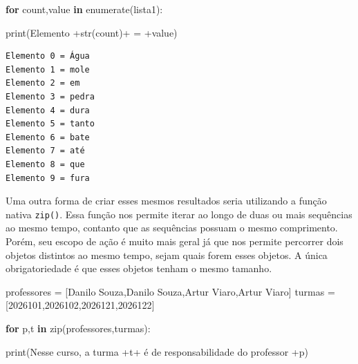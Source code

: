 \documentclass[
  brazilian,
  letterpaper,
  DIV=11,
  numbers=noendperiod]{scrreprt}
\newenvironment{Shaded}{\begin{snugshade}}{\end{snugshade}}
\newcommand{\BuiltInTok}[1]{\textcolor[rgb]{0.00,0.23,0.31}{#1}}
\newcommand{\ControlFlowTok}[1]{\textcolor[rgb]{0.00,0.23,0.31}{\textbf{#1}}}
\newcommand{\KeywordTok}[1]{\textcolor[rgb]{0.00,0.23,0.31}{\textbf{#1}}}
\newcommand{\NormalTok}[1]{\textcolor[rgb]{0.00,0.23,0.31}{#1}}
\newcommand{\OperatorTok}[1]{\textcolor[rgb]{0.37,0.37,0.37}{#1}}
\newcommand{\StringTok}[1]{\textcolor[rgb]{0.13,0.47,0.30}{#1}}
\begin{document}
\begin{Shaded}
\begin{Highlighting}[]
\ControlFlowTok{for}\NormalTok{ count,value }\KeywordTok{in} \BuiltInTok{enumerate}\NormalTok{(lista1):}
    
    \BuiltInTok{print}\NormalTok{(}\StringTok{\textquotesingle{}Elemento \textquotesingle{}}\OperatorTok{+}\BuiltInTok{str}\NormalTok{(count)}\OperatorTok{+}\StringTok{\textquotesingle{} = \textquotesingle{}}\OperatorTok{+}\NormalTok{value)}
\end{Highlighting}
\end{Shaded}

\begin{verbatim}
Elemento 0 = Água
Elemento 1 = mole
Elemento 2 = em
Elemento 3 = pedra
Elemento 4 = dura
Elemento 5 = tanto
Elemento 6 = bate
Elemento 7 = até
Elemento 8 = que
Elemento 9 = fura
\end{verbatim}

Uma outra forma de criar esses mesmos resultados seria utilizando a
função nativa \texttt{zip()}. Essa função nos permite iterar ao longo de
duas ou mais sequências ao mesmo tempo, contanto que as sequências
possuam o mesmo comprimento. Porém, seu escopo de ação é muito mais
geral já que nos permite percorrer dois objetos distintos ao mesmo
tempo, sejam quais forem esses objetos. A única obrigatoriedade é que
esses objetos tenham o mesmo tamanho.

\begin{Shaded}
\begin{Highlighting}[]
\NormalTok{professores }\OperatorTok{=}\NormalTok{ [}\StringTok{\textquotesingle{}Danilo Souza\textquotesingle{}}\NormalTok{,}\StringTok{\textquotesingle{}Danilo Souza\textquotesingle{}}\NormalTok{,}\StringTok{\textquotesingle{}Artur Viaro\textquotesingle{}}\NormalTok{,}\StringTok{\textquotesingle{}Artur Viaro\textquotesingle{}}\NormalTok{]}
\NormalTok{turmas }\OperatorTok{=}\NormalTok{ [}\StringTok{\textquotesingle{}2026101\textquotesingle{}}\NormalTok{,}\StringTok{\textquotesingle{}2026102\textquotesingle{}}\NormalTok{,}\StringTok{\textquotesingle{}2026121\textquotesingle{}}\NormalTok{,}\StringTok{\textquotesingle{}2026122\textquotesingle{}}\NormalTok{]}

\ControlFlowTok{for}\NormalTok{ p,t }\KeywordTok{in} \BuiltInTok{zip}\NormalTok{(professores,turmas):}
    
    \BuiltInTok{print}\NormalTok{(}\StringTok{\textquotesingle{}Nesse curso, a turma \textquotesingle{}}\OperatorTok{+}\NormalTok{t}\OperatorTok{+}\StringTok{\textquotesingle{} é de responsabilidade do professor \textquotesingle{}}\OperatorTok{+}\NormalTok{p)}
\end{Highlighting}
\end{Shaded}
\end{document}
